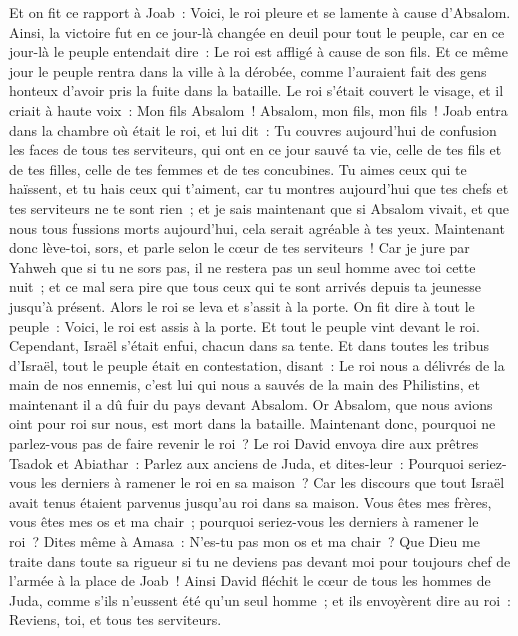 \begin{multicols}{2}
\VerseOne{}Et on fit ce rapport à Joab~: Voici, le roi pleure et se lamente à cause d'Absalom.
Ainsi, la victoire fut en ce jour-là changée en deuil pour tout le peuple, car en ce jour-là le peuple entendait dire~: Le roi est affligé à cause de son fils.
Et ce même jour le peuple rentra dans la ville à la dérobée, comme l'auraient fait des gens honteux d'avoir pris la fuite dans la bataille.
Le roi s'était couvert le visage, et il criait à haute voix~: Mon fils Absalom~! Absalom, mon fils, mon fils~!
Joab entra dans la chambre où était le roi, et lui dit~: Tu couvres aujourd'hui de confusion les faces de tous tes serviteurs, qui ont en ce jour sauvé ta vie, celle de tes fils et de tes filles, celle de tes femmes et de tes concubines.
Tu aimes ceux qui te haïssent, et tu hais ceux qui t'aiment, car tu montres aujourd'hui que tes chefs et tes serviteurs ne te sont rien~; et je sais maintenant que si Absalom vivait, et que nous tous fussions morts aujourd'hui, cela serait agréable à tes yeux.
Maintenant donc lève-toi, sors, et parle selon le cœur de tes serviteurs~! Car je jure par Yahweh que si tu ne sors pas, il ne restera pas un seul homme avec toi cette nuit~; et ce mal sera pire que tous ceux qui te sont arrivés depuis ta jeunesse jusqu'à présent.
Alors le roi se leva et s'assit à la porte. On fit dire à tout le peuple~: Voici, le roi est assis à la porte. Et tout le peuple vint devant le roi. Cependant, Israël s'était enfui, chacun dans sa tente.
Et dans toutes les tribus d'Israël, tout le peuple était en contestation, disant~: Le roi nous a délivrés de la main de nos ennemis, c'est lui qui nous a sauvés de la main des Philistins, et maintenant il a dû fuir du pays devant Absalom.
Or Absalom, que nous avions oint pour roi sur nous, est mort dans la bataille. Maintenant donc, pourquoi ne parlez-vous pas de faire revenir le roi~?
Le roi David envoya dire aux prêtres Tsadok et Abiathar~: Parlez aux anciens de Juda, et dites-leur~: Pourquoi seriez-vous les derniers à ramener le roi en sa maison~? Car les discours que tout Israël avait tenus étaient parvenus jusqu'au roi dans sa maison.
Vous êtes mes frères, vous êtes mes os et ma chair~; pourquoi seriez-vous les derniers à ramener le roi~?
Dites même à Amasa~: N'es-tu pas mon os et ma chair~? Que Dieu me traite dans toute sa rigueur si tu ne deviens pas devant moi pour toujours chef de l'armée à la place de Joab~!
Ainsi David fléchit le cœur de tous les hommes de Juda, comme s'ils n'eussent été qu'un seul homme~; et ils envoyèrent dire au roi~: Reviens, toi, et tous tes serviteurs.

\end{multicols}
